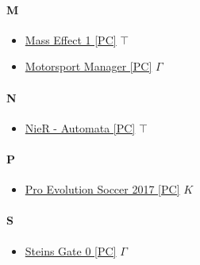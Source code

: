 	\paragraph{M} \hypertarget{GM}{}
		\begin{itemize}
			
			\item \href{https://mega.nz/#!PWxgAY7T!9ecCWI-wOYAvleoh9kGFqbkE-oviQ7AhWhDRuVk_4Ic} {Mass Effect 1 [PC]} $\top$ \\ 
			\item \href{https://mega.nz/#F!AjIHQIrB!reMYJVu-NoOPQCsYjrRYOQ} {Motorsport Manager [PC]} $\varGamma$ \\ 
			
		\end{itemize}
	
	\paragraph{N} \hypertarget{GN}{}
		\begin{itemize}
			
			\item \href{https://mega.nz/#!nGoFGRpa!5_D-7ppOYQHiTkiNbbG1k0xvjjflP-KrNeQWIam4gxs} {NieR - Automata [PC]} $\top$ \\ 

			
		\end{itemize}
	
	\paragraph{P} \hypertarget{GP}{}
		\begin{itemize}
				
				\item \href{https://mega.nz/#!ShskXayI!pi9fejgLluzm4fNjxdcZRd8c8JP_IcKKh_oUrpR9IUY} {Pro Evolution Soccer 2017 [PC]} $K$ \\ 
				
				
			\end{itemize}
		
		\paragraph{S} \hypertarget{GS}{}
			\begin{itemize}
				
				\item \href{https://mega.nz/#F!onglgIQS!68JusNKmh8Vl5pnSBHwDaw} {Steins Gate 0 [PC]} $\varGamma$ \\ 
				
				
			\end{itemize}
	
